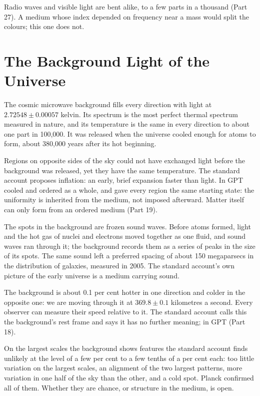  Radio waves and visible light are bent alike, to a few parts in a thousand (Part 27). A medium whose index depended on frequency near a mass would split the colours; this one does not.

\section{The Background Light of the Universe}

The cosmic microwave background fills every direction with light at $2.72548\pm0.00057$ kelvin. Its spectrum is the most perfect thermal spectrum measured in nature, and its temperature is the same in every direction to about one part in 100,000. It was released when the universe cooled enough for atoms to form, about 380,000 years after its hot beginning.

 Regions on opposite sides of the sky could not have exchanged light before the background was released, yet they have the same temperature. The standard account proposes inflation: an early, brief expansion faster than light. In GPT  cooled and ordered as a whole, and gave every region the same starting state: the uniformity is inherited from the medium, not imposed afterward. Matter itself can only form from an ordered medium (Part 19).

 The spots in the background are frozen sound waves. Before atoms formed, light and the hot gas of nuclei and electrons moved together as one fluid, and sound waves ran through it; the background records them as a series of peaks in the size of its spots. The same sound left a preferred spacing of about 150 megaparsecs in the distribution of galaxies, measured in 2005. The standard account's own picture of the early universe is a medium carrying sound.

 The background is about 0.1 per cent hotter in one direction and colder in the opposite one: we are moving through it at $369.8\pm0.1$ kilometres a second. Every observer can measure their speed relative to it. The standard account calls this the background's rest frame and says it has no further meaning; in GPT  (Part 18).

 On the largest scales the background shows features the standard account finds unlikely at the level of a few per cent to a few tenths of a per cent each: too little variation on the largest scales, an alignment of the two largest patterns, more variation in one half of the sky than the other, and a cold spot. Planck confirmed all of them. Whether they are chance, or structure in the medium, is open.

